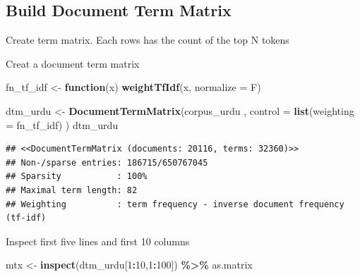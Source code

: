 \documentclass[
]{article}
\newenvironment{Shaded}{\begin{snugshade}}{\end{snugshade}}
\newcommand{\ControlFlowTok}[1]{\textcolor[rgb]{0.13,0.29,0.53}{\textbf{#1}}}
\newcommand{\DataTypeTok}[1]{\textcolor[rgb]{0.13,0.29,0.53}{#1}}
\newcommand{\DecValTok}[1]{\textcolor[rgb]{0.00,0.00,0.81}{#1}}
\newcommand{\KeywordTok}[1]{\textcolor[rgb]{0.13,0.29,0.53}{\textbf{#1}}}
\newcommand{\NormalTok}[1]{#1}
\newcommand{\OperatorTok}[1]{\textcolor[rgb]{0.81,0.36,0.00}{\textbf{#1}}}
\newcommand{\StringTok}[1]{\textcolor[rgb]{0.31,0.60,0.02}{#1}}
\begin{document}
\hypertarget{build-document-term-matrix}{%
\subsection{Build Document Term
Matrix}\label{build-document-term-matrix}}

Create term matrix. Each rows has the count of the top N tokens

\begin{Shaded}
\end{Shaded}

Creat a document term matrix

\begin{Shaded}
\begin{Highlighting}[]
\NormalTok{fn\_tf\_idf \textless{}{-}}\StringTok{ }\ControlFlowTok{function}\NormalTok{(x) }\KeywordTok{weightTfIdf}\NormalTok{(x, }\DataTypeTok{normalize =}\NormalTok{ F)}

\NormalTok{dtm\_urdu \textless{}{-}}\StringTok{ }\KeywordTok{DocumentTermMatrix}\NormalTok{(corpus\_urdu}
\NormalTok{                               , }\DataTypeTok{control =} \KeywordTok{list}\NormalTok{(}\DataTypeTok{weighting =}\NormalTok{ fn\_tf\_idf)}
\NormalTok{                               )}
\NormalTok{dtm\_urdu}
\end{Highlighting}
\end{Shaded}

\begin{verbatim}
## <<DocumentTermMatrix (documents: 20116, terms: 32360)>>
## Non-/sparse entries: 186715/650767045
## Sparsity           : 100%
## Maximal term length: 82
## Weighting          : term frequency - inverse document frequency (tf-idf)
\end{verbatim}

Inspect first five lines and first 10 columns

\begin{Shaded}
\begin{Highlighting}[]
\NormalTok{mtx \textless{}{-}}\StringTok{ }\KeywordTok{inspect}\NormalTok{(dtm\_urdu[}\DecValTok{1}\OperatorTok{:}\DecValTok{10}\NormalTok{,}\DecValTok{1}\OperatorTok{:}\DecValTok{100}\NormalTok{]) }\OperatorTok{\%\textgreater{}\%}\StringTok{ }\NormalTok{as.matrix}
\end{Highlighting}
\end{Shaded}
\end{document}
